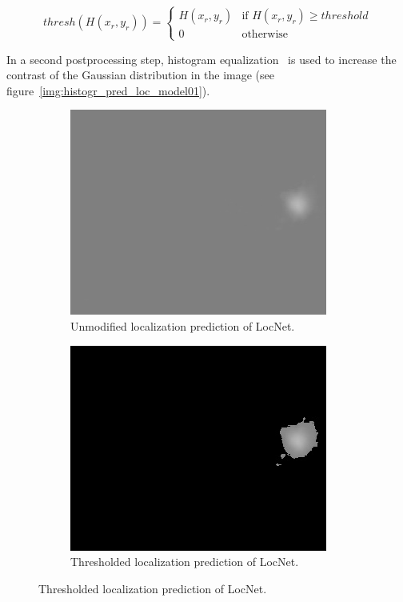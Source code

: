 \[
    thresh(H(x_r,y_r))= 
\begin{cases}
    H(x_r,y_r)& \text{if } H(x_r,y_r)\geq threshold\\
    0         & \text{otherwise}
\end{cases}
\]

In a second postprocessing step, histogram equalization~\cite{equalization_histogram1987pizer} is used to increase the contrast of the Gaussian distribution in the image (see figure~\ref{img:histogr_pred_loc_model01}).

\begin{figure}
\centering
\begin{subfigure}[t]{0.49\textwidth}
\centering
\includegraphics[width=.65\textwidth]{images/predictions/model1/thresholded-frame001-Dataset2/orig_prediction_frame001.jpg}
\caption{Unmodified localization prediction of LocNet.}
\label{img:pred_loc_model01_unmod}
\end{subfigure}
\begin{subfigure}[t]{0.49\textwidth}
\centering
\includegraphics[width=.65\textwidth]{images/predictions/model1/thresholded-frame001-Dataset2/ONLY_THRESHOLDE_Dataset2.jpg}
\caption{Thresholded localization prediction of LocNet.}
\label{img:thresh_pred_loc_model01}
\end{subfigure}


\end{figure}
